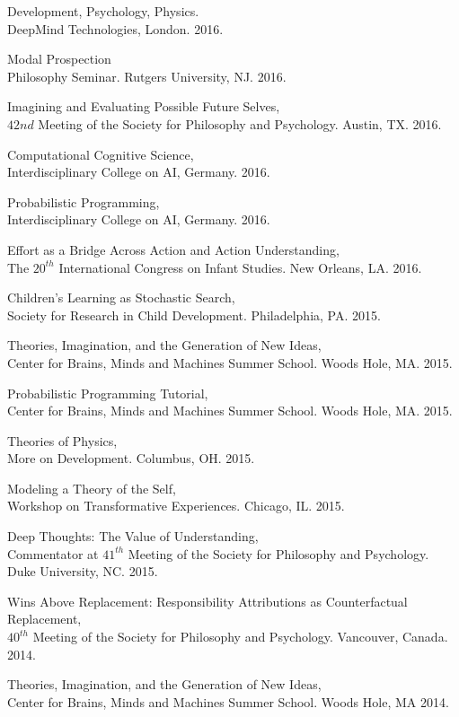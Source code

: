 \documentclass[margin,line,pifont,palatino,courier]{res}
\begin{document}
\begin{resume}
Development, Psychology, Physics. \\DeepMind Technologies, London. 2016. 

Modal Prospection \\ Philosophy Seminar. Rutgers University, NJ. 2016.

Imagining and Evaluating Possible Future Selves, \\ $42nd$ Meeting of the Society for Philosophy and Psychology. Austin, TX. 2016.

Computational Cognitive Science,\\ Interdisciplinary College on AI, Germany. 2016. 

Probabilistic Programming,\\ Interdisciplinary College on AI, Germany. 2016. 

Effort as a Bridge Across Action and Action Understanding,\\
The $20^{th}$ International Congress on Infant Studies. New Orleans, LA. 2016.

Children's Learning as Stochastic Search, \\Society for Research in Child Development. Philadelphia, PA. 2015.

Theories, Imagination, and the Generation of New Ideas, \\Center for Brains, Minds and Machines Summer School. Woods Hole, MA. 2015.

Probabilistic Programming Tutorial, \\ Center for Brains, Minds and Machines Summer School. Woods Hole, MA. 2015.

Theories of Physics, \\More on Development. Columbus, OH. 2015.

Modeling a Theory of the Self, \\Workshop on Transformative Experiences. Chicago, IL. 2015.

Deep Thoughts: The Value of Understanding,\\ Commentator at $41^{th}$ Meeting of the Society for Philosophy and Psychology. Duke University, NC. 2015.

Wins Above Replacement: Responsibility Attributions as Counterfactual Replacement,\\ $40^{th}$ Meeting of the Society for Philosophy and Psychology. Vancouver, Canada. 2014.

Theories, Imagination, and the Generation of New Ideas, \\Center for Brains, Minds and Machines Summer School. Woods Hole, MA 2014.


\end{resume}
\end{document}
